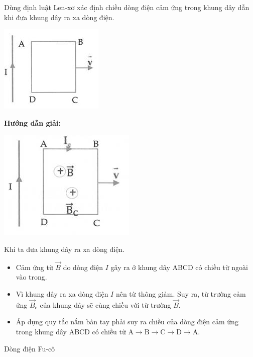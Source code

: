 {
{	
Dùng định luật Len-xơ xác định chiều dòng điện cảm ứng trong khung dây dẫn khi đưa khung dây ra xa dòng điện.
\begin{center}
	\includegraphics[scale=0.8]{../figs/VN11-PH-29-L-020-2-h69.jpg}
\end{center}}
{\begin{center}
	\textbf{Hướng dẫn giải:}
\end{center}
	\begin{center}
		\includegraphics[scale=0.8]{../figs/VN11-PH-29-L-020-2-h70.jpg}
	\end{center}
	
Khi ta đưa khung dây ra xa dòng điện.
\begin{itemize}
	\item Cảm ứng từ $\vec{B}$ do dòng điện $I$ gây ra ở khung dây ABCD có chiều từ ngoài vào trong.
	\item Vì khung dây ra xa dòng điện $I$ nên từ thông giảm. Suy ra, từ trường cảm ứng $\vec{B}_\text{c}$ của khung dây sẽ cùng chiều với từ trường $\vec{B}$.
	\item Áp dụng quy tắc nắm bàn tay phải suy ra chiều của dòng điện cảm ứng trong khung dây ABCD có chiều từ $\text{A}\rightarrow \text{B}\rightarrow \text{C}\rightarrow \text{D}\rightarrow \text{A}$.  
\end{itemize}}
}


\begin{dang}{Dòng điện Fu-cô}
\end{dang}



